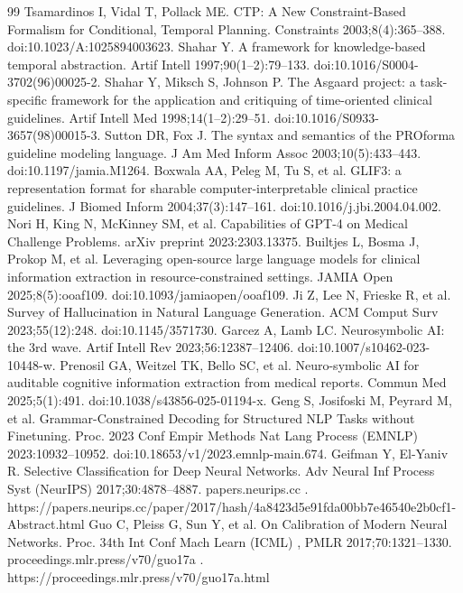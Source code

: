 \begin{thebibliography}{99}
\label{r52} Tsamardinos I, Vidal T, Pollack ME. CTP: A New Constraint-Based Formalism for Conditional, Temporal Planning. Constraints 2003;8(4):365--388. doi:10.1023/A:1025894003623.
\label{r53} Shahar Y. A framework for knowledge-based temporal abstraction. Artif Intell 1997;90(1--2):79--133. doi:10.1016/S0004-3702(96)00025-2.
\label{r54} Shahar Y, Miksch S, Johnson P. The Asgaard project: a task-specific framework for the application and critiquing of time-oriented clinical guidelines. Artif Intell Med 1998;14(1--2):29--51. doi:10.1016/S0933-3657(98)00015-3.
\label{r55} Sutton DR, Fox J. The syntax and semantics of the PROforma guideline modeling language. J Am Med Inform Assoc 2003;10(5):433--443. doi:10.1197/jamia.M1264.
\label{r56} Boxwala AA, Peleg M, Tu S, et al. GLIF3: a representation format for sharable computer-interpretable clinical practice guidelines. J Biomed Inform 2004;37(3):147--161. doi:10.1016/j.jbi.2004.04.002.
\label{r57} Nori H, King N, McKinney SM, et al. Capabilities of GPT-4 on Medical Challenge Problems. arXiv preprint 2023:2303.13375.
\label{r58} Builtjes L, Bosma J, Prokop M, et al. Leveraging open-source large language models for clinical information extraction in resource-constrained settings. JAMIA Open 2025;8(5):ooaf109. doi:10.1093/jamiaopen/ooaf109.
\label{r59} Ji Z, Lee N, Frieske R, et al. Survey of Hallucination in Natural Language Generation. ACM Comput Surv 2023;55(12):248. doi:10.1145/3571730.
\label{r60} Garcez A, Lamb LC. Neurosymbolic AI: the 3rd wave. Artif Intell Rev 2023;56:12387--12406. doi:10.1007/s10462-023-10448-w.
\label{r61} Prenosil GA, Weitzel TK, Bello SC, et al. Neuro-symbolic AI for auditable cognitive information extraction from medical reports. Commun Med 2025;5(1):491. doi:10.1038/s43856-025-01194-x.
\label{r62} Geng S, Josifoski M, Peyrard M, et al. Grammar-Constrained Decoding for Structured NLP Tasks without Finetuning. Proc. 2023 Conf Empir Methods Nat Lang Process (EMNLP) 2023:10932--10952. doi:10.18653/v1/2023.emnlp-main.674.
\label{r63} Geifman Y, El-Yaniv R. Selective Classification for Deep Neural Networks. Adv Neural Inf Process Syst (NeurIPS) 2017;30:4878--4887. papers.neurips.cc . https://papers.neurips.cc/paper/2017/hash/4a8423d5e91fda00bb7e46540e2b0cf1-Abstract.html
\label{r64} Guo C, Pleiss G, Sun Y, et al. On Calibration of Modern Neural Networks. Proc. 34th Int Conf Mach Learn (ICML) , PMLR 2017;70:1321--1330. proceedings.mlr.press/v70/guo17a . https://proceedings.mlr.press/v70/guo17a.html

\end{thebibliography}
